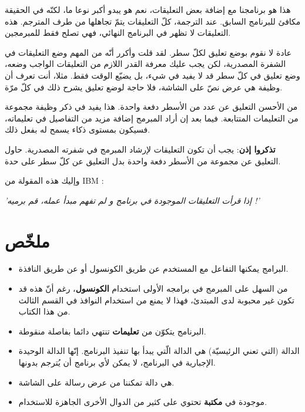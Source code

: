 هذا هو برنامجنا مع إضافة بعض التعليقات، نعم هو يبدو أكبر نوعا ما، لكنّه في الحقيقة مكافئ للبرنامج السابق. عند الترجمة، كلّ التعليقات يتمّ تجاهلها من طرف المترجم. هذه التعليقات لا تظهر في البرنامج النهائي، فهي تصلح فقط للمبرمجين.

عادة لا نقوم بوضع تعليق لكلّ سطر. لقد قلت وأكرر أنّه من المهم وضع التعليقات في الشفرة المصدرية، لكن يجب عليك معرفة القدر اللازم من التعليقات الواجب وضعه، وضع تعليق في كلّ سطر قد لا يفيد في شيء، بل يضيّع الوقت فقط. مثلا، أنت تعرف أن وظيفة
هي عرض نصّ على الشاشة، فلا حاجة لوضع تعليق يشرح ذلك في كلّ مرّة.

من الأحسن التعليق عن عدد من الأسطر دفعة واحدة. هذا يفيد في ذكر وظيفة مجموعة من التعليمات المتتابعة. فيما بعد إن أراد المبرمج إضافة مزيد من التفاصيل في تعليماته، فسيكون بمستوى ذكاء يسمح له بفعل ذلك.

\textbf{تذكروا إذن}:
يجب أن تكون التعليقات لإرشاد المبرمج في شفرته المصدرية. حاول التعليق عن مجموعة من الأسطر دفعة واحدة بدل التعليق عن كلّ سطر على حدة.

وإليك هذه المقولة من
\textenglish{IBM}
:
\begin{center}
  \itshape\Large
  'إذا قرأت التعليقات الموجودة في برنامج و لم تفهم مبدأ عمله، قم برميه !'
\end{center}

\section*{ملخّص}
\begin{itemize}
  \item البرامج يمكنها التفاعل مع المستخدم عن طريق الكونسول أو عن طريق النافذة.
  \item من السهل على المبرمج في برامجه الأولى استخدام
\textbf{الكونسول}،
رغم أنّ هذه قد تكون غير محبوبة لدى المبتدئ، فهذا لا يمنع من استخدام النوافذ في القسم الثالث من هذا الكتاب.
  \item البرنامج يتكوّن من
\textbf{تعليمات}
 تنتهي دائما بفاصلة منقوطة.
  \item الدالة
 (التي تعني الرئيسيّة) هي الدالة الّتي يبدأ بها تنفيذ البرنامج. إنّها الدالة الوحيدة الإجبارية في البرنامج، لا يمكن لأي برنامج أن يُترجم بدونها.
 \item {}
 هي دالة تمكننا من عرض رسالة على الشاشة.
 \item {}
موجودة في
\textbf{مكتبة}
 تحتوي على كثير من الدوال الأخرى الجاهزة للاستخدام.
\end{itemize}

